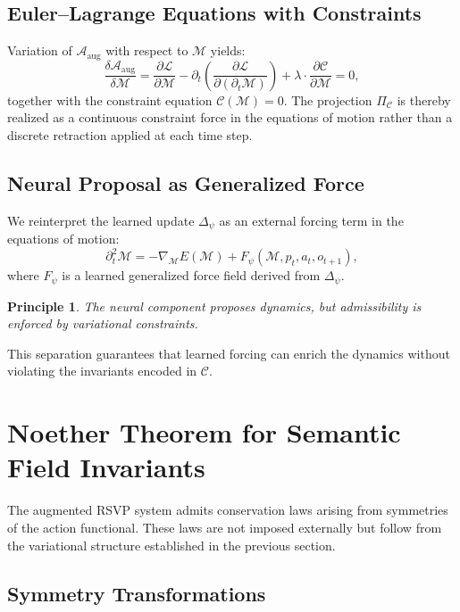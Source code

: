\documentclass[11pt]{article}
\newtheorem{principle}{Principle}
\begin{document}
\subsection{Euler--Lagrange Equations with Constraints}

Variation of $\mathcal{A}_{\text{aug}}$ with respect to $\mathcal{M}$
yields:
\[
\frac{\delta \mathcal{A}_{\text{aug}}}{\delta \mathcal{M}}
=
\frac{\partial \mathcal{L}}{\partial \mathcal{M}}
-
\partial_t \left(\frac{\partial \mathcal{L}}{\partial (\partial_t \mathcal{M})}\right)
+
\lambda \cdot \frac{\partial \mathcal{C}}{\partial \mathcal{M}}
= 0,
\]
together with the constraint equation $\mathcal{C}(\mathcal{M}) = 0$.
The projection $\Pi_{\mathcal{C}}$ is thereby realized as a continuous
constraint force in the equations of motion rather than a discrete
retraction applied at each time step.

\subsection{Neural Proposal as Generalized Force}

We reinterpret the learned update $\Delta_\psi$ as an external forcing term
in the equations of motion:
\[
\partial_t^2 \mathcal{M}
=
-\nabla_{\mathcal{M}} E(\mathcal{M})
+
F_\psi(\mathcal{M},p_t,a_t,o_{t+1}),
\]
where $F_\psi$ is a learned generalized force field derived from $\Delta_\psi$.

\begin{principle}
The neural component proposes dynamics, but admissibility is enforced
by variational constraints.
\end{principle}

This separation guarantees that learned forcing can enrich the dynamics
without violating the invariants encoded in $\mathcal{C}$.

\section{Noether Theorem for Semantic Field Invariants}

The augmented RSVP system admits conservation laws arising from symmetries
of the action functional.
These laws are not imposed externally but follow from the variational
structure established in the previous section.

\subsection{Symmetry Transformations}
\end{document}
